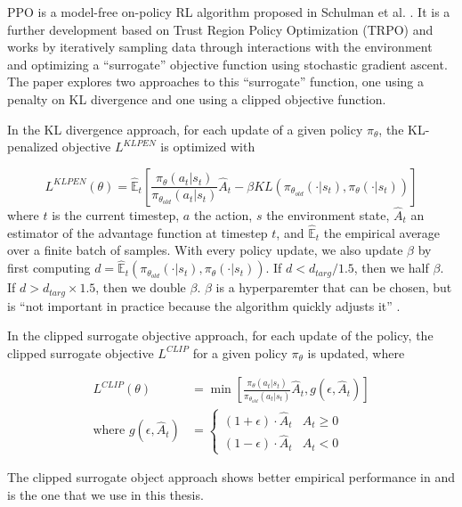 PPO is a model-free on-policy RL algorithm proposed in Schulman et al. \cite{schulman2017proximal}.
It is a further development based on Trust Region Policy Optimization (TRPO) \cite{schulman2017trust} and works by iteratively sampling data through interactions with the environment and optimizing a ``surrogate'' objective function using stochastic gradient ascent. The paper explores two approaches to this ``surrogate'' function, one using a penalty on KL divergence and one using a clipped objective function.

In the KL divergence approach, for each update of a given policy $\pi_\theta$, the KL-penalized objective $L^{KLPEN}$ is optimized with

\begin{equation}
	L^{KLPEN}(\theta) = \hat{\mathbb{E}}_t \left[\frac{\pi_\theta(a_t | s_t)}{\pi_{\theta_{old}} (a_t | s_t)} \hat{A}_t - \beta KL \left( \pi_{\theta_{old}} (\cdot | s_t), \pi_\theta(\cdot | s_t)\right) \right]
\end{equation}
where $t$ is the current timestep, $a$ the action, $s$ the environment state, $\hat{A}_t$ an estimator of the advantage function at timestep $t$, and $\hat{\mathbb{E}}_t$ the empirical average over a finite batch of samples.
With every policy update, we also update $\beta$ by first computing $d = \hat{\mathbb{E}}_t\left(\pi_{\theta_{old}} (\cdot | s_t), \pi_{\theta}(\cdot | s_t)\right)$.
If $d < d_{targ} / 1.5$, then we half $\beta$.
If $d > d_{targ} \times 1.5$, then we double $\beta$. $\beta$ is a hyperparemter that can be chosen, but is ``not important in practice because the algorithm quickly adjusts it'' \cite{schulman2017proximal}.

In the clipped surrogate objective approach, for each update of the policy, the clipped surrogate objective $L^{CLIP}$ for a given policy $\pi_\theta$ is updated, where

\begin{align}
	L^{CLIP}(\theta) &= \min \left[ 
		\frac{\pi_\theta(a_t | s_t)}{\pi_{\theta_{old}} (a_t | s_t)} \hat{A}_t, g(\epsilon, \hat{A}_t)
	\right]\\
	\text{where } g(\epsilon, \hat{A}_t) &= \begin{cases}
		(1 + \epsilon) \cdot \hat{A}_t & \hat{A}_t \geq 0 \\
		(1 - \epsilon) \cdot \hat{A}_t & \hat{A}_t < 0
	\end{cases}
\end{align}

The clipped surrogate object approach shows better empirical performance in \cite{schulman2017proximal} and is the one that we use in this thesis.

